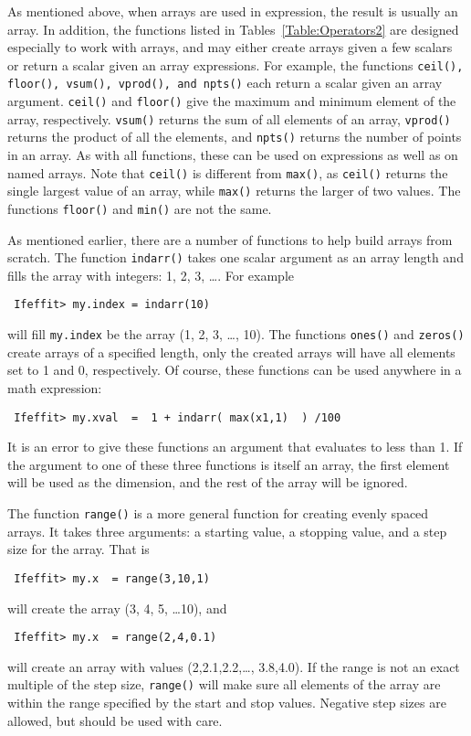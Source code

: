 As mentioned above, when arrays are used in expression, the result is
usually an array.  In addition, the functions listed in
Tables~{\ref{Table:Operators2}} are designed especially to work with
arrays, and may either create arrays given a few scalars or return a scalar
given an array expressions.  For example, the functions {\texttt{ceil(),
    floor(), vsum(), vprod(), {\rm{and}} npts()}} each return a scalar
given an array argument.  {\tt{ceil()}} and {\tt{floor()}} give the maximum
and minimum element of the array, respectively.  {\tt{vsum()}} returns the
sum of all elements of an array, {\tt{vprod()}} returns the product of all
the elements, and {\tt{npts()}} returns the number of points in an array.
As with all functions, these can be used on expressions as well as on named
arrays.  Note that {\tt{ceil()}} is different from {\tt{max()}}, as
{\tt{ceil()}} returns the single largest value of an array, while
{\tt{max()}} returns the larger of two values.  The functions
{\tt{floor()}} and {\tt{min()}} are not the same.


As mentioned earlier, there are a number of functions to help build arrays
from scratch. The function {\texttt{indarr()}} takes one scalar argument as
an array length and fills the array with integers: 1, 2, 3, \ldots. For
example
\begin{verbatim}
 Ifeffit> my.index = indarr(10)
\end{verbatim}
\noindent
will fill {\texttt{my.index}} be the array (1, 2, 3, \ldots, 10).  The
functions {\texttt{ones()}} and {\texttt{zeros()}} create arrays of a
specified length, only the created arrays will have all elements set to 1
and 0, respectively.  Of course, these functions can be used anywhere in a
math expression:
\begin{verbatim}
 Ifeffit> my.xval  =  1 + indarr( max(x1,1)  ) /100
\end{verbatim}
\noindent
It is an error to give these functions an argument that evaluates to less
than 1.  If the argument to one of these three functions is itself an
array, the first element will be used as the dimension, and the rest of the
array will be ignored.  

The function {\tt{range()}} is a more general function for creating evenly
spaced arrays.  It takes three arguments: a starting value, a stopping
value, and a step size for the array.  That is
\begin{verbatim}
 Ifeffit> my.x  = range(3,10,1)
\end{verbatim}
\noindent
will create the array (3, 4, 5, \ldots 10), and
\begin{verbatim}
 Ifeffit> my.x  = range(2,4,0.1)
\end{verbatim}
\noindent
will create an array with values (2,2.1,2.2,\ldots, 3.8,4.0).  If the range
is not an exact multiple of the step size, {\tt{range()}} will make sure
all elements of the array are within the range specified by the start and
stop values. Negative step sizes are allowed, but should be used with care.

